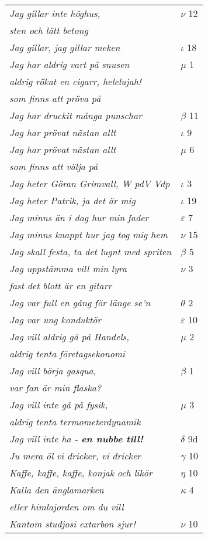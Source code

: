 \documentclass[a6paper,10pt]{article}
\begin{document}
\newpage
\setlength{\oddsidemargin}{-0.37in}
\begin{table}[!h]
\begin{tabular}{l l}
\textit{Jag gillar inte höghus,}	&$\nu$ 12\\
\textit{sten och lätt betong} &\\
\textit{Jag gillar, jag gillar meken} &$\iota$ 18\\
\textit{Jag har aldrig vart på snusen}	&$\mu$ 1\\
\textit{aldrig rökat en cigarr, helelujah!} &\\
\textit{som finns att pröva på} &\\
\textit{Jag har druckit många punschar}	&$\beta$ 11\\
\textit{Jag har prövat nästan allt}	&$\iota$ 9\\
\textit{Jag har prövat nästan allt }	&$\mu$ 6\\
\textit{som finns att välja på} &\\
\textit{Jag heter Göran Grimvall, W pdV Vdp}	&$\iota$ 3\\
\textit{Jag heter Patrik, ja det är mig}&$\iota$ 19\\
\textit{Jag minns än i dag hur min fader}	&$\varepsilon$ 7\\
\textit{Jag minns knappt hur jag tog mig hem}	&$\nu$ 15\\
\textit{Jag skall festa, ta det lugnt med spriten}	&$\beta$ 5\\
\textit{Jag uppstämma vill min lyra}	&$\nu$ 3\\
\textit{fast det blott är en gitarr} &\\
\textit{Jag var full en gång för länge se'n}	&$\theta$ 2\\
\textit{Jag var ung konduktör}	&$\varepsilon$ 10\\
\textit{Jag vill aldrig gå på Handels,}	&$\mu$ 2\\
\textit{aldrig tenta företagsekonomi} &\\
\textit{Jag vill börja gasqua,}	&$\beta$ 1\\
\textit{var fan är min flaska?} &\\
\textit{Jag vill inte gå på fysik,}	&$\mu$ 3\\
\textit{aldrig tenta termometerdynamik} &\\
\textit{Jag vill inte ha - \textbf{en nubbe till!}}	&$\delta$ 9d\\
\textit{Ju mera öl vi dricker, vi dricker}	&$\gamma$ 10\\
\textit{Kaffe, kaffe, kaffe, konjak och likör}	&$\eta$ 10\\
\textit{Kalla den änglamarken}	&$\kappa$ 4\\
\textit{eller himlajorden om du vill} &\\
\textit{Kantom studjosi extarbon sjur!}	&$\nu$ 10\\
\end{tabular}
\end{table}
\end{document}
